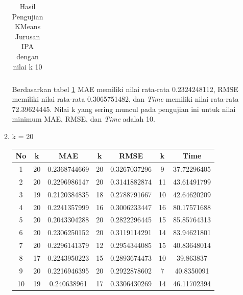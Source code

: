 \begin{enumerate}
\begin{enumerate}
\begin{longtable}[H]{|c|c|c|c|c|c|c|}
                        \caption{Hasil Pengujian KMeans Jurusan IPA dengan nilai k 10}
                        \label{tab:ipa k = 10}
                    \end{longtable}
                \endgroup
            
            Berdasarkan tabel \ref{tab:ipa k = 10} MAE memiliki nilai rata-rata 0.2324248112, RMSE memiliki nilai rata-rata 0.3065751482, dan \textit{Time} memiliki nilai rata-rata 72.39624445. Nilai k yang sering muncul pada pengujian ini untuk nilai minimum MAE, RMSE, dan \textit{Time} adalah 10.
            
            \item k = 20 \\
                \begingroup
                \renewcommand\arraystretch{1.5}
                    \begin{longtable}[H]{|c|c|c|c|c|c|c|}
                        \hline
                        No & k & MAE & k & RMSE & k & Time \\
                        \hline
                        1 & 20 & 0.2368744669 & 20 & 0.3267037296 & 9 & 37.72296405\\
                        \hline
                        2 & 20 & 0.2296986147 & 20 & 0.3141882874 & 11 & 43.61491799\\
                        \hline
                        3 & 19 & 0.2120384835 & 18 & 0.2788791667 & 10 & 42.64620209\\
                        \hline
                        4 & 20 & 0.2241357999 & 16 & 0.3006233447 & 16 & 80.17571688\\
                        \hline
                        5 & 20 & 0.2043304288 & 20 & 0.2822296445 & 15 & 85.85764313\\
                        \hline
                        6 & 20 & 0.2306250152 & 20 & 0.3119114291 & 14 & 83.94621801\\
                        \hline
                        7 & 20 & 0.2296141379 & 12 & 0.2954344085 & 15 & 40.83648014\\
                        \hline
                        8 & 17 & 0.2243950223 & 15 & 0.2893674473 & 10 & 39.863837\\
                        \hline
                        9 & 20 & 0.2216946395 & 20 & 0.2922878602 & 7 & 40.8350091\\
                        \hline
                        10 & 19 & 0.240638961 & 17 & 0.3306430269 & 14 & 46.11702394\\
                        \hline
                        

\end{longtable}
\end{enumerate}
\end{enumerate}
